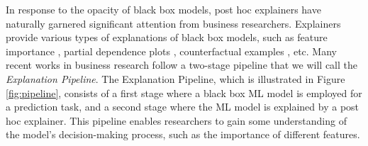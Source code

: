 \documentclass[mnsc,blindrev]{informs3}
\begin{document}
In response to the opacity of black box models, post hoc explainers have naturally garnered significant attention from business researchers. Explainers provide various types of explanations of black box models, such as feature importance \citep{ribeiro16lime,lundberg17shap}, partial dependence plots \citep{friedman01pdp}, counterfactual examples \citep{mothilal20dice}, etc. Many recent works in business research follow a two-stage pipeline that we will call the \emph{Explanation Pipeline}. The Explanation Pipeline, which is illustrated in Figure \ref{fig:pipeline}, consists of a first stage where a black box ML model is employed for a prediction task, and a second stage where the ML model is explained by a post hoc explainer. This pipeline enables researchers to gain some understanding of the model's decision-making process, such as the importance of different features.%


\end{document}
